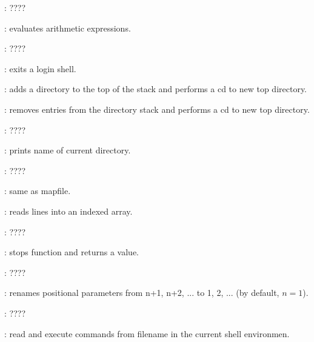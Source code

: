 \begin{compactenum}
\item [\symbolbash] : \dotfill ????

\item [\symbolbash] : evaluates arithmetic expressions.

\item [\symbolbash] : \dotfill ????

\item [\symbolbash] : exits a login shell.

\item [\symbolbash] : adds a directory to the top of the stack and performs a cd to new top directory.
\item [\symbolbash] : removes entries from the directory stack and performs a cd to new top directory.

\item [\symbolbash] : \dotfill ????

\item [\symbolbash] : prints name of current directory.

\item [\symbolbash] : \dotfill ????

\item [\symbolbash] : same as mapfile.

\item [\symbolbash] : reads lines into an indexed array.

\item [\symbolbash] : \dotfill ????

\item [\symbolbash] : stops function and returns a value.

\item [\symbolbash] : \dotfill ????

\item [\symbolbash] : renames positional parameters from n+1, n+2, ... to 1, 2, ... (by default, $n = 1$).

\item [\symbolbash] : \dotfill ????

\item [\symbolbash] : read and execute commands from filename in the current shell environmen.


\end{compactenum}
